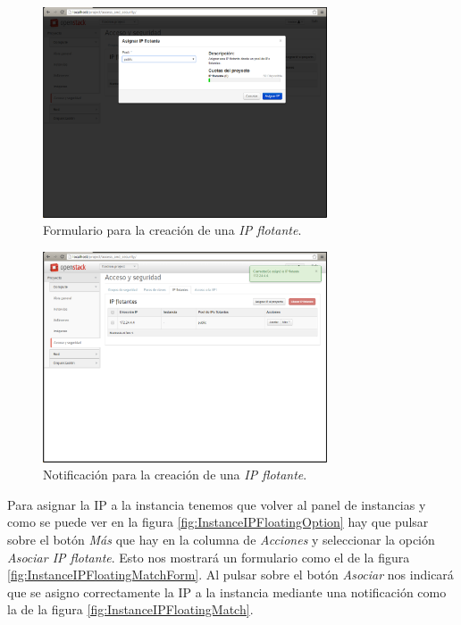 \documentclass{article}
\begin{document}
\begin{figure}[h]
  \centering
    \includegraphics[width=0.75\textwidth]{img/m_049.png}
  \caption{Formulario para la creación de una \emph{IP flotante}.}
  \label{fig:IPFloatingCreateForm}
\end{figure}	

\begin{figure}[h]
  \centering
    \includegraphics[width=0.75\textwidth]{img/m_050.png}
  \caption{Notificación para la creación de una \emph{IP flotante}.}
  \label{fig:IPFloatingCreate}
\end{figure}	

	Para asignar la IP a la instancia tenemos que volver al panel de instancias y como se puede ver en la figura \ref{fig:InstanceIPFloatingOption} hay que pulsar sobre el botón \emph{Más} que hay en la columna de \emph{Acciones} y seleccionar la opción \emph{Asociar IP flotante}. Esto nos mostrará un formulario como el de la figura  \ref{fig:InstanceIPFloatingMatchForm}. Al pulsar sobre el botón \emph{Asociar} nos indicará que se asigno correctamente la IP a la instancia mediante una notificación como la de la figura \ref{fig:InstanceIPFloatingMatch}.
\end{document}
